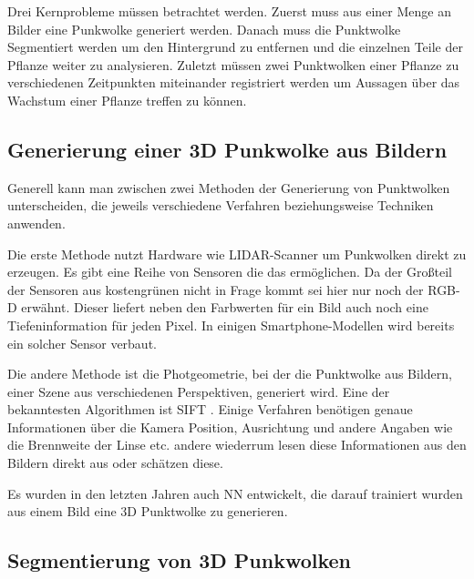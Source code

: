 \documentclass[12pt,titlepage, twoside]{article}
\begin{document}
Drei Kernprobleme müssen betrachtet werden. Zuerst muss aus einer Menge an Bilder eine Punkwolke generiert werden. Danach muss die Punktwolke Segmentiert werden um den Hintergrund zu entfernen und die einzelnen Teile der Pflanze weiter zu analysieren. 
Zuletzt müssen zwei Punktwolken einer Pflanze zu verschiedenen Zeitpunkten miteinander registriert werden um Aussagen über das Wachstum einer Pflanze treffen zu können.

\subsection{Generierung einer 3D Punkwolke aus Bildern}
\label{sec:stand:pointcloud}

Generell kann man zwischen zwei Methoden der Generierung von Punktwolken unterscheiden, die jeweils verschiedene Verfahren beziehungsweise Techniken anwenden.

Die erste Methode nutzt Hardware wie LIDAR-Scanner um Punkwolken direkt zu erzeugen. Es gibt eine Reihe von Sensoren die das ermöglichen. Da der Großteil der Sensoren aus kostengrünen nicht in Frage kommt sei hier nur noch der RGB-D erwähnt. 
Dieser liefert neben den Farbwerten für ein Bild auch noch eine Tiefeninformation für jeden Pixel. In einigen Smartphone-Modellen wird bereits ein solcher Sensor verbaut.

Die andere Methode ist die Photgeometrie, bei der die Punktwolke aus Bildern, einer Szene aus verschiedenen Perspektiven, generiert wird. Eine der bekanntesten Algorithmen ist SIFT \cite{Sift}.
Einige Verfahren benötigen genaue Informationen über die Kamera Position, Ausrichtung und andere Angaben wie die Brennweite der Linse etc. andere wiederrum lesen diese Informationen aus den Bildern direkt aus oder schätzen diese.

Es wurden in den letzten Jahren auch NN entwickelt, die darauf trainiert wurden aus einem Bild eine 3D Punktwolke zu generieren.


\subsection{Segmentierung von 3D Punkwolken}
\label{sec:stand:segmentierung}
\end{document}
